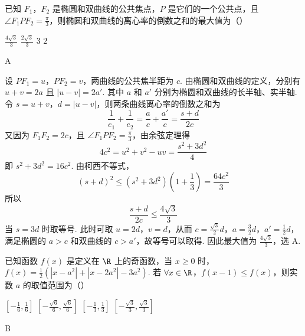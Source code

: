 \begin{problem}
已知 \(F_{1}\)，\(F_{2}\) 是椭圆和双曲线的公共焦点，\(P\) 是它们的一个公共点，且 \(\angle F_{1}PF_{2} = \frac{\pi}{3}\)，则椭圆和双曲线的离心率的倒数之和的最大值为（\quad）

\choices
    {\(\frac{4\sqrt{3}}{3}\)}
    {\(\frac{2\sqrt{3}}{3}\)}
    {\(3\)}
    {\(2\)}
\end{problem}

\begin{answer}
A
\end{answer}

\begin{solution}
设 \(PF_1=u\)，\(PF_2=v\)，两曲线的公共焦半距为 \(c\). 由椭圆和双曲线的定义，分别有 \(u+v=2a\) 且 \(|u-v|=2a'\).
其中 \(a\) 和 \(a'\) 分别为椭圆和双曲线的长半轴、实半轴. 令 \(s=u+v\)，\(d=|u-v|\)，则两条曲线离心率的倒数之和为
\[
\frac{1}{e_1}+\frac{1}{e_2}=\frac{a}{c}+\frac{a'}{c}=\frac{s+d}{2c}
\]
又因为 \(F_1F_2=2c\)，且 \(\angle F_1PF_2=\frac\pi3\)，由余弦定理得
\[
4c^2=u^2+v^2-uv=\frac{s^2+3d^2}{4}
\]
即 \(s^2+3d^2=16c^2\). 由柯西不等式，
\[
(s+d)^2\leqslant(s^2+3d^2)\left(1+\frac13\right)=\frac{64c^2}{3}
\]
所以
\[
\frac{s+d}{2c}\leqslant\frac{4\sqrt{3}}{3}
\]
当 \(s=3d\) 时取等号. 此时可取 \(u=2d\)，\(v=d\)，从而
\(c=\frac{\sqrt{3}}{2}d\)，\(a=\frac{3}{2}d\)，\(a'=\frac{1}{2}d\)，满足椭圆的 \(a>c\) 和双曲线的 \(c>a'\)，故等号可以取得. 因此最大值为 \(\frac{4\sqrt{3}}{3}\)，选 A.
\end{solution}

\begin{problem}
已知函数 \( f(x) \) 是定义在 \(\R\) 上的奇函数，当 \( x \geqslant 0 \) 时，\( f(x) = \frac{1}{2} (|x - a^2| + |x - 2a^2| - 3a^2) \). 若 \(\forall x \in \R\)，\(f(x - 1) \leqslant f(x)\)，则实数 \( a \) 的取值范围为（\quad）

\choices
    {\( \left[-\frac{1}{6},\frac{1}{6}\right] \)}
    {\( \left[-\frac{\sqrt{6}}{6},\frac{\sqrt{6}}{6}\right] \)}
    {\( \left[-\frac{1}{3},\frac{1}{3}\right] \)}
    {\( \left[-\frac{\sqrt{3}}{3},\frac{\sqrt{3}}{3}\right] \)}
\end{problem}

\begin{answer}
B
\end{answer}

